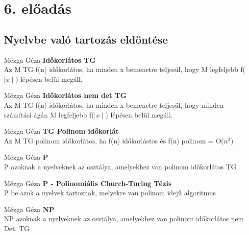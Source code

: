\section{6. előadás}

\subsection{Nyelvbe való tartozás eldöntése}

\begin{definicio}{Mézga Géza}
	\textbf{Időkorlátos TG} \\[3pt]
	 Az M TG f(n) időkorlátos, ha minden x bemenetre teljesül, hogy M legfeljebb f($\mid x\mid$) lépésen belül megáll. \\[0pt]
\end{definicio}

\begin{definicio}{Mézga Géza}
	\textbf{Időkorlátos nem det TG} \\[3pt]
	 Az M TG f(n) időkorlátos, ha minden x bemenetre teljesül, hogy minden számítási ágán M legfeljebb f($\mid x \mid$) lépésen belül megáll. \\[0pt]
\end{definicio}

\begin{definicio}{Mézga Géza}
	 \textbf{TG Polinom időkorlát} \\[3pt]
	 Az M TG polinom időkorlátos, ha f(n) időkorlástos és f(n) polinom = O($n^2$) \\[0pt]
\end{definicio}

\begin{definicio}{Mézga Géza}
	 \textbf{P} \\[3pt]
	 P azoknak a nyelveknek az osztálya, amelyekhez van polinom időkorlátos TG \\[0pt]
\end{definicio}

\begin{definicio}{Mézga Géza}
	 \textbf{P - Polinomiális Church-Turing Tézis} \\[3pt]
	 P be azok a nyelvek tartoznak, melyekre van polinom idejű algoritmus \\[0pt]
\end{definicio}

\begin{definicio}{Mézga Géza}
	 \textbf{NP} \\[3pt]
	 NP azoknak a nyelveknek az osztálya, amelyekhez van polinom időkorlátos nem Det. TG \\[0pt]
\end{definicio}

